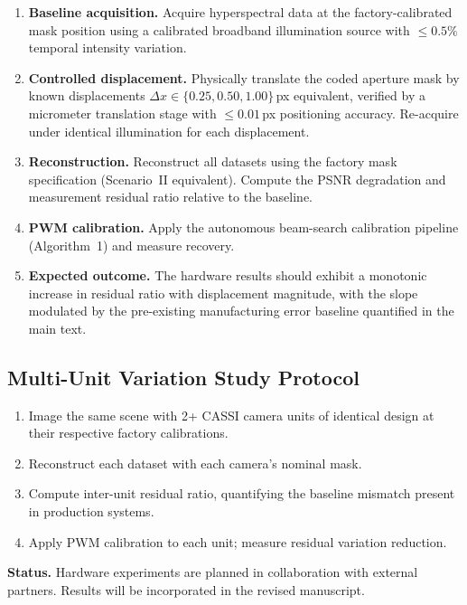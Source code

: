 \documentclass[11pt]{article}
\begin{document}
\begin{enumerate}
  \item \textbf{Baseline acquisition.}  Acquire hyperspectral data at the
    factory-calibrated mask position using a calibrated broadband illumination
    source with $\leq 0.5\%$ temporal intensity variation.
  \item \textbf{Controlled displacement.}  Physically translate the coded
    aperture mask by known displacements $\Delta x \in \{0.25, 0.50, 1.00\}$\,px
    equivalent, verified by a micrometer translation stage with $\leq 0.01$\,px
    positioning accuracy.  Re-acquire under identical illumination for each
    displacement.
  \item \textbf{Reconstruction.}  Reconstruct all datasets using the factory
    mask specification (Scenario~II equivalent).  Compute the PSNR degradation
    and measurement residual ratio relative to the baseline.
  \item \textbf{PWM calibration.}  Apply the autonomous beam-search calibration
    pipeline (Algorithm~1) and measure recovery.
  \item \textbf{Expected outcome.}  The hardware results should exhibit a
    monotonic increase in residual ratio with displacement magnitude,
    with the slope modulated by the pre-existing manufacturing error
    baseline quantified in the main text.
\end{enumerate}

\subsection{Multi-Unit Variation Study Protocol}

\begin{enumerate}
  \item Image the same scene with 2+ CASSI camera units of identical design
    at their respective factory calibrations.
  \item Reconstruct each dataset with each camera's nominal mask.
  \item Compute inter-unit residual ratio, quantifying the baseline mismatch
    present in production systems.
  \item Apply PWM calibration to each unit; measure residual variation reduction.
\end{enumerate}

\noindent\textbf{Status.}  Hardware experiments are planned in collaboration
with external partners.  Results will be incorporated in the revised manuscript.
\end{document}
